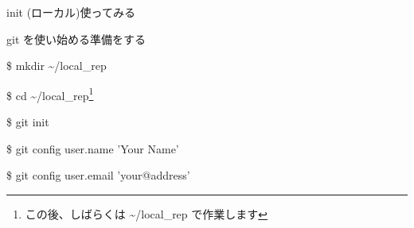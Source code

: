 
\begin{frame}[t]{init (ローカル)}{使ってみる}

  git を使い始める準備をする
  \vspace{4ex}

  \$ mkdir \~{}/local\_rep

  \$ cd \~{}/local\_rep\footnote{この後、しばらくは \~{}/local\_rep で作業します}

  \$ git init

  \$ git config user.name 'Your Name'

  \$ git config user.email 'your@address'

\end{frame}

